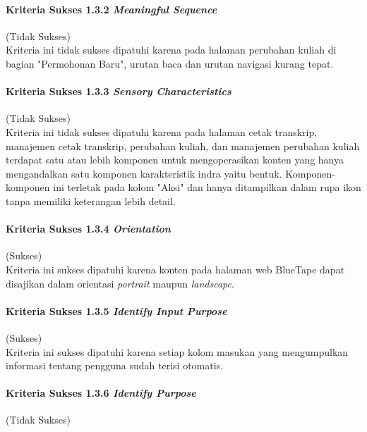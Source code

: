 \paragraph{Kriteria Sukses 1.3.2 \textit{Meaningful Sequence}}
\label{par:kepatuhan_bluetape_kriteria_sukses_1.3.2}
(Tidak Sukses)\\

Kriteria ini tidak sukses dipatuhi karena pada halaman perubahan kuliah di bagian "Permohonan Baru", urutan baca dan urutan navigasi kurang tepat. 

\paragraph{Kriteria Sukses 1.3.3 \textit{Sensory Characteristics}}
\label{par:kepatuhan_bluetape_kriteria_sukses_1.3.3}
(Tidak Sukses)\\

Kriteria ini tidak sukses dipatuhi karena pada halaman cetak transkrip, manajemen cetak transkrip, perubahan kuliah, dan manajemen perubahan kuliah terdapat satu atau lebih komponen untuk mengoperasikan konten yang hanya mengandalkan satu komponen karakteristik indra yaitu bentuk. Komponen-komponen ini terletak pada kolom "Aksi" dan hanya ditampilkan dalam rupa ikon tanpa memiliki keterangan lebih detail.

\paragraph{Kriteria Sukses 1.3.4 \textit{Orientation}}
\label{par:kepatuhan_bluetape_kriteria_sukses_1.3.4}
(Sukses)\\

Kriteria ini sukses dipatuhi karena konten pada halaman web BlueTape dapat disajikan dalam orientasi \textit{portrait} maupun \textit{landscape}.

\paragraph{Kriteria Sukses 1.3.5 \textit{Identify Input Purpose}}
\label{par:kepatuhan_bluetape_kriteria_sukses_1.3.5}
(Sukses)\\

Kriteria ini sukses dipatuhi karena setiap kolom masukan yang mengumpulkan informasi tentang pengguna sudah terisi otomatis.

\paragraph{Kriteria Sukses 1.3.6 \textit{Identify Purpose}}
\label{par:kepatuhan_bluetape_kriteria_sukses_1.3.6}
(Tidak Sukses)\\

